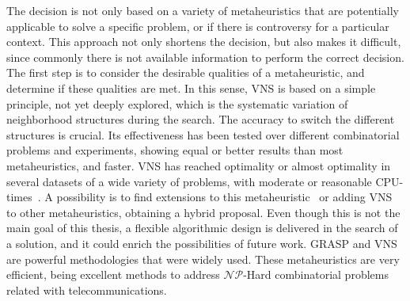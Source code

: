 The decision is not only based on a variety of metaheuristics that are potentially applicable to solve 
a specific problem, or if there is controversy for a particular context. This approach not only shortens the decision, but also makes it difficult, since commonly there is not available information to perform the correct decision. The first step is to consider the desirable qualities of a metaheuristic, and determine if these qualities are met. In this sense, VNS is based on a simple principle, not yet deeply explored, which is the 
systematic variation of neighborhood structures during the search. The accuracy to switch the different structures is crucial. Its effectiveness has been tested over different combinatorial problems and experiments, showing equal or better results than most metaheuristics, and faster. VNS has reached optimality or almost optimality in several 
datasets of a wide variety of problems, with moderate or reasonable CPU-times~\cite{98}. A possibility is to 
find extensions to this metaheuristic~\cite{16,17,18}  or adding 
VNS to other metaheuristics, obtaining a hybrid proposal. 
Even though this is not the main goal of this thesis, a flexible algorithmic design is delivered in the 
search of a solution, and it could enrich the possibilities of future work. GRASP and VNS are powerful methodologies that were widely used. These metaheuristics are very efficient, being 
excellent methods to address $\mathcal{NP}$-Hard combinatorial problems related with telecommunications.

